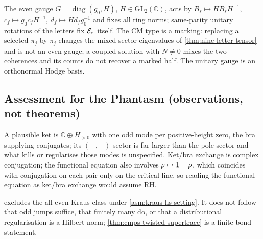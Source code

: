 \begin{proposition}
\label{prop:cm-type-gauge}
The even gauge $G = \operatorname{diag}(g_0,H)$, $H\in\mathrm{GL}_2(\mathbb C)$, acts by $B_s\mapsto HB_sH^{-1}$,
$c_f\mapsto g_0c_fH^{-1}$, $d_f\mapsto Hd_fg_0^{-1}$ and fixes all ring norms; same-parity unitary
rotations of the letters fix $\mathcal E_{\mathrm d}$ itself. The CM type is a marking: replacing a selected
$\pi_j$ by $\bar\pi_j$ changes the mixed-sector eigenvalues of \cref{thm:nine-letter-tensor} and
is not an even gauge; a coupled solution with $N\ne0$ mixes the two coherences and its counts do
not recover a marked half. The unitary gauge is an orthonormal Hodge basis.
\end{proposition}

\subsection{Assessment for the Phantasm (observations, not theorems)}

\begin{observation}
\label{obs:phantasm-bond-candidate}
A plausible ket is $\mathbb C\oplus H_{>0}$ with one odd mode per positive-height zero, the bra
supplying conjugates; its $(-,-)$ sector is far larger than the pole sector and what kills or
regularises those modes is unspecified. Ket/bra exchange is complex conjugation; the functional
equation also involves $\rho\mapsto1-\rho$, which coincides with conjugation on each pair only on
the critical line, so reading the functional equation as ket/bra exchange would assume RH.
\end{observation}

\begin{observation}
\label{obs:fermionic-jumps-necessary}
 excludes the all-even Kraus class under
\cref{asm:kraus-hs-setting}. It does not follow that odd jumps suffice, that finitely many do, or
that a distributional regularisation is a Hilbert norm; \cref{thm:cmps-twisted-supertrace} is a
finite-bond statement.
\end{observation}

